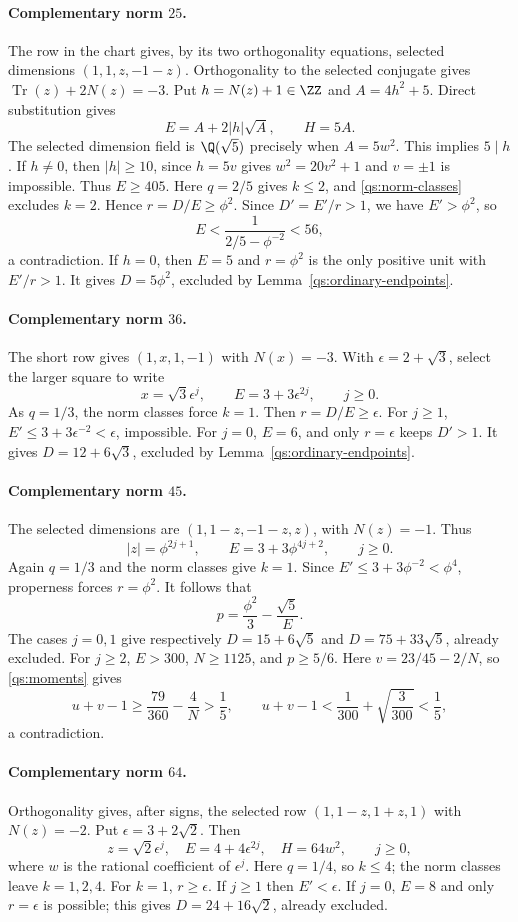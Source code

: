 \paragraph{Complementary norm $25$.}
The row in the chart gives, by its two orthogonality equations,
selected dimensions $(1,1,z,-1-z)$. Orthogonality to the selected
conjugate gives $\operatorname{Tr}(z)+2N(z)=-3$. Put
$h=N(z)+1\in\ZZ$ and $A=4h^2+5$. Direct substitution gives
\[
 E=A+2|h|\sqrt A,\qquad H=5A.
\]
The selected dimension field is $\Q(\sqrt5)$ precisely when
$A=5w^2$. This implies $5\mid h$. If $h\ne0$, then $|h|\ge10$,
since $h=5v$ gives $w^2=20v^2+1$ and $v=\pm1$ is impossible.
Thus $E\ge405$. Here $q=2/5$ gives $k\le2$, and
\eqref{qs:norm-classes} excludes $k=2$. Hence $r=D/E\ge\phi^2$.
Since $D'=E'/r>1$, we have $E'>\phi^2$, so
\[
 E<\frac1{2/5-\phi^{-2}}<56,
\]
a contradiction. If $h=0$, then $E=5$ and $r=\phi^2$ is the only
positive unit with $E'/r>1$. It gives $D=5\phi^2$, excluded by
Lemma~\ref{qs:ordinary-endpoints}.

\paragraph{Complementary norm $36$.}
The short row gives $(1,x,1,-1)$ with $N(x)=-3$.
With $\epsilon=2+\sqrt3$, select the larger square to write
\[
 x=\sqrt3\epsilon^j,\qquad E=3+3\epsilon^{2j},\qquad j\ge0.
\]
As $q=1/3$, the norm classes force $k=1$. Then $r=D/E\ge\epsilon$.
For $j\ge1$, $E'\le3+3\epsilon^{-2}<\epsilon$, impossible.
For $j=0$, $E=6$, and only $r=\epsilon$ keeps $D'>1$.
It gives $D=12+6\sqrt3$, excluded by Lemma~\ref{qs:ordinary-endpoints}.

\paragraph{Complementary norm $45$.}
The selected dimensions are $(1,1-z,-1-z,z)$, with $N(z)=-1$.
Thus
\[
 |z|=\phi^{2j+1},\qquad E=3+3\phi^{4j+2},\qquad j\ge0.
\]
Again $q=1/3$ and the norm classes give $k=1$.
Since $E'\le3+3\phi^{-2}<\phi^4$, properness forces $r=\phi^2$.
It follows that
\[
 p=\frac{\phi^2}{3}-\frac{\sqrt5}{E}.
\]
The cases $j=0,1$ give respectively $D=15+6\sqrt5$ and
$D=75+33\sqrt5$, already excluded. For $j\ge2$,
$E>300$, $N\ge1125$, and $p\ge5/6$. Here
$v=23/45-2/N$, so \eqref{qs:moments} gives
\[
 u+v-1\ge\frac{79}{360}-\frac4N>\frac15,
 \qquad
 u+v-1<\frac1{300}+\sqrt{\frac3{300}}<\frac15,
\]
a contradiction.

\paragraph{Complementary norm $64$.}
Orthogonality gives, after signs, the selected row
$(1,1-z,1+z,1)$ with $N(z)=-2$. Put $\epsilon=3+2\sqrt2$.
Then
\[
 z=\sqrt2\epsilon^j,\quad E=4+4\epsilon^{2j},\quad
 H=64w^2,\qquad j\ge0,
\]
where $w$ is the rational coefficient of $\epsilon^j$.
Here $q=1/4$, so $k\le4$; the norm classes leave $k=1,2,4$.
For $k=1$, $r\ge\epsilon$. If $j\ge1$ then $E'<\epsilon$.
If $j=0$, $E=8$ and only $r=\epsilon$ is possible; this gives
$D=24+16\sqrt2$, already excluded.

